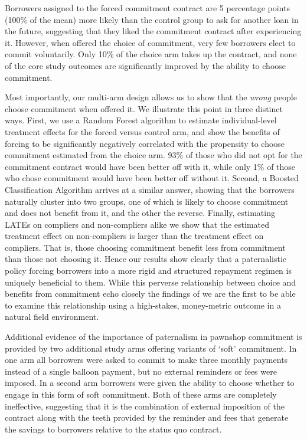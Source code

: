 \documentclass[oneside,11pt]{article}
\begin{document}
Borrowers assigned to the forced commitment contract are 5 percentage points (100\% of the mean) more likely than the control group to ask for another loan in the future, suggesting that they liked the commitment contract after experiencing it.  However, when offered the choice of commitment, very few borrowers elect to commit voluntarily.  Only 10\% of the choice arm takes up the contract, and none of the core study outcomes are significantly improved by the ability to choose commitment.  


Most importantly, our multi-arm design allows us to show that the \textit{wrong} people choose commitment when offered it.   We illustrate this point in three distinct ways.  First, we use a Random Forest algorithm \citep{atheygrf} to estimate individual-level treatment effects for the forced versus control arm, and show the benefits of forcing to be significantly negatively correlated with the propensity to choose commitment estimated from the choice arm.  93\% of those who did not opt for the commitment contract would have been better off with it, while only 1\% of those who chose commitment would have been better off without it.  Second, a Boosted Classification Algorithm arrives at a similar answer, showing that the borrowers naturally cluster into two groups, one of which is likely to choose commitment and does not benefit from it, and the other the reverse.  Finally, estimating LATEs on compliers and non-compliers alike we show that the estimated treatment effect on non-compliers is larger than the treatment effect on compliers.  That is, those choosing commitment benefit less from commitment than those not choosing it.  Hence our results show clearly that a paternalistic policy forcing borrowers into a more rigid and structured repayment regimen is uniquely beneficial to them.  While this perverse relationship between choice and benefits from commitment echo closely the findings of \cite{Sprenger} we are the first to be able to examine this relationship using a high-stakes, money-metric outcome in a natural field environment.

Additional evidence of the importance of paternalism in pawnshop commitment is provided by two additional study arms offering variants of `soft' commitment.  In one arm all borrowers were asked to commit to make three monthly payments instead of a single balloon payment, but no external reminders or fees were imposed.  In a second arm borrowers were given the ability to choose whether to engage in this form of soft commitment.  Both of these arms are completely ineffective, suggesting that it is the combination of external imposition of the contract along with the teeth provided by the reminder and fees that generate the savings to borrowers relative to the status quo contract.
\end{document}
